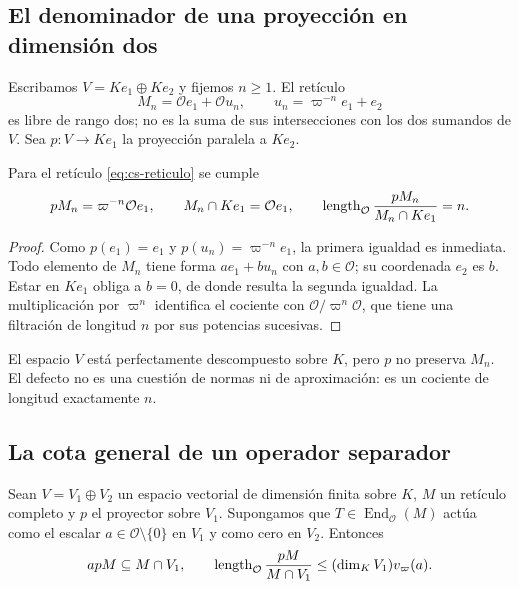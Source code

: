 \subsection{El denominador de una proyección en dimensión dos}

Escribamos $V=Ke_1\oplus Ke_2$ y fijemos $n\ge1$. El retículo
\begin{equation}
 M_n=\mathcal Oe_1+\mathcal O u_n,
 \qquad u_n=\varpi^{-n}e_1+e_2
 \label{eq:cs-reticulo}
\end{equation}
es libre de rango dos; no es la suma de sus intersecciones
con los dos sumandos de $V$. Sea $p:V\to Ke_1$ la proyección
paralela a $Ke_2$.

\begin{proposicion}
\label{prop:cs-modelo-proyector}
Para el retículo \eqref{eq:cs-reticulo} se cumple
\begin{equation}
 pM_n=\varpi^{-n}\mathcal Oe_1,
 \qquad M_n\cap Ke_1=\mathcal Oe_1,
 \qquad
 \operatorname{length}_{\mathcal O}\frac{pM_n}{M_n\cap Ke_1}=n.
 \label{eq:cs-longitud-exacta}
\end{equation}
\end{proposicion}

\begin{proof}
Como $p(e_1)=e_1$ y $p(u_n)=\varpi^{-n}e_1$,
la primera igualdad es inmediata. Todo elemento de $M_n$ tiene
forma $ae_1+bu_n$ con $a,b\in\mathcal O$; su coordenada $e_2$
es $b$. Estar en $Ke_1$ obliga a $b=0$, de donde resulta la
segunda igualdad. La multiplicación por $\varpi^n$ identifica
el cociente con $\mathcal O/\varpi^n\mathcal O$, que tiene
una filtración de longitud $n$ por sus potencias sucesivas.
\end{proof}

El espacio $V$ está perfectamente descompuesto sobre $K$,
pero $p$ no preserva $M_n$. El defecto no es una cuestión de
normas ni de aproximación: es un cociente de longitud exactamente $n$.

\subsection{La cota general de un operador separador}

\begin{lema}
\label{lem:cs-operador}
Sean $V=V_1\oplus V_2$ un espacio vectorial de dimensión finita
sobre $K$, $M$ un retículo completo y $p$ el proyector sobre
$V_1$. Supongamos que $T\in\operatorname{End}_{\mathcal O}(M)$
actúa como el escalar $a\in\mathcal O\setminus\{0\}$ en $V_1$
y como cero en $V_2$. Entonces
\begin{equation}
 apM\subseteq M\cap V_1,
 \qquad
 \operatorname{length}_{\mathcal O}\frac{pM}{M\cap V_1}
 \le (\dim_K V_1)v_\varpi(a).
 \label{eq:cs-operator-bound}
\end{equation}
\end{lema}

